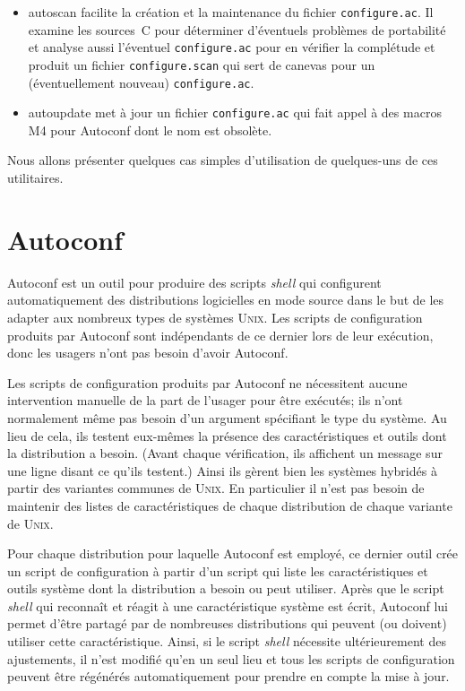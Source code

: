 \documentclass[11pt,a4paper]{article}
\newcommand{\bitem}{\item[$\bullet$]}
\begin{document}
\begin{itemize}
  \bitem \textsf{autoscan} facilite la création et la maintenance du
  fichier \texttt{configure.ac}. Il examine les sources~\textsf{C}
  pour déterminer d'éventuels problèmes de portabilité et analyse
  aussi l'éventuel \texttt{configure.ac} pour en vérifier la
  complétude et produit un fichier \texttt{configure.scan} qui sert de
  canevas pour un (éventuellement nouveau) \texttt{configure.ac}.

  \bitem \textsf{autoupdate} met à jour un fichier
  \texttt{configure.ac} qui fait appel à des macros \textsf{M4} pour
  \textsf{Autoconf} dont le nom est obsolète.

\end{itemize}

\noindent Nous allons présenter quelques cas simples d'utilisation de
quelques-uns de ces utilitaires.


\section{\textsf{Autoconf}}

\textsf{Autoconf} est un outil pour produire des scripts \emph{shell}
qui configurent automatiquement des distributions logicielles en mode
source dans le but de les adapter aux nombreux types de systèmes
\textsc{Unix}. Les scripts de configuration produits par
\textsf{Autoconf} sont indépendants de ce dernier lors de leur
exécution, donc les usagers n'ont pas besoin d'avoir
\textsf{Autoconf}.

Les scripts de configuration produits par \textsf{Autoconf} ne
nécessitent aucune intervention manuelle de la part de l'usager pour
être exécutés; ils n'ont normalement même pas besoin d'un argument
spécifiant le type du système. Au lieu de cela, ils testent eux-mêmes
la présence des caractéristiques et outils dont la distribution a
besoin. (Avant chaque vérification, ils affichent un message sur une
ligne disant ce qu'ils testent.) Ainsi ils gèrent bien les systèmes
hybridés à partir des variantes communes de \textsc{Unix}. En
particulier il n'est pas besoin de maintenir des listes de
caractéristiques de chaque distribution de chaque variante de
\textsc{Unix}.

Pour chaque distribution pour laquelle \textsf{Autoconf} est employé,
ce dernier outil crée un script de configuration à partir d'un script
qui liste les caractéristiques et outils système dont la distribution
a besoin ou peut utiliser. Après que le script \emph{shell} qui
reconnaît et réagit à une caractéristique système est écrit,
\textsf{Autoconf} lui permet d'être partagé par de nombreuses
distributions qui peuvent (ou doivent) utiliser cette
caractéristique. Ainsi, si le script \emph{shell} nécessite
ultérieurement des ajustements, il n'est modifié qu'en un seul lieu et
tous les scripts de configuration peuvent être régénérés
automatiquement pour prendre en compte la mise à jour.
\end{document}
